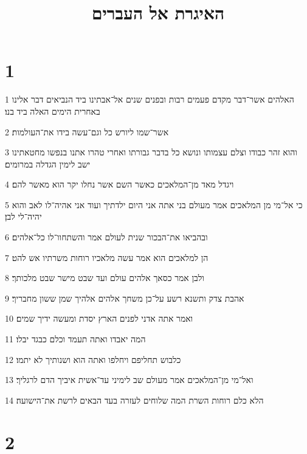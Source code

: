 

\title{האיגרת אל העברים}


\chapter{1}

\par 1 האלהים אשר־דבר מקדם פעמים רבות ובפנים שנים אל־אבתינו ביד הנביאים דבר אלינו באחרית הימים האלה ביד בנו׃
\par 2 אשר־שמו ליורש כל וגם־עשה בידו את־העולמות׃
\par 3 והוא זהר כבודו וצלם עצמותו ונושא כל בדבר גבורתו ואחרי טהרו אתנו בנפשו מחטאתינו ישב לימין הגדלה במרומים׃
\par 4 ויגדל מאד מן־המלאכים כאשר השם אשר נחלו יקר הוא מאשר להם׃
\par 5 כי אל־מי מן המלאכים אמר מעולם בני אתה אני היום ילדתיך ועוד אני אהיה־לו לאב והוא יהיה־לי לבן׃
\par 6 ובהביאו את־הבכור שנית לעולם אמר והשתחוו־לו כל־אלהים׃
\par 7 הן למלאכים הוא אמר עשה מלאכיו רוחות משרתיו אש להט׃
\par 8 ולבן אמר כסאך אלהים עולם ועד שבט מישר שבט מלכותך׃
\par 9 אהבת צדק ותשנא רשע על־כן משחך אלהים אלהיך שמן ששון מחבריך׃
\par 10 ואמר אתה אדני לפנים הארץ יסדת ומעשה ידיך שמים׃
\par 11 המה יאבדו ואתה תעמד וכלם כבגד יבלו׃
\par 12 כלבוש תחליפם ויחלפו ואתה הוא ושנותיך לא יתמו׃
\par 13 ואל־מי מן־המלאכים אמר מעולם שב לימיני עד־אשית איביך הדם לרגליך׃
\par 14 הלא כלם רוחות השרת המה שלוחים לעזרה בעד הבאים לרשת את־הישועה׃

\chapter{2}

